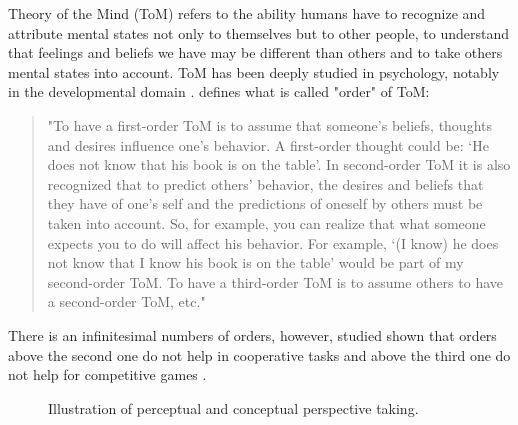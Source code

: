 \documentclass[english,a4paper,11pt,twoside]{StyleThese}
\begin{document}
Theory of the Mind (ToM) refers to the ability humans have to recognize and attribute mental states not only to themselves but to other people, to understand that feelings and beliefs we have may be different than others and to take others mental states into account. ToM has been deeply studied in psychology, notably in the developmental domain \cite{baron1985does, premack1978does}. \cite{verbrugge2008learning} defines what is called "order" of ToM:
\begin{quote}
"To have a first-order ToM is to assume that someone’s beliefs,
thoughts and desires influence one’s behavior. A first-order thought could be: ‘He does not know that his book is on the table’. In second-order ToM it is also recognized that to predict others’ behavior, the desires and beliefs that they have of one’s self and the predictions of oneself by others must be taken into account. So, for example, you can realize that what someone expects you to do will affect his behavior. For example, ‘(I know) he does not know that I know his book is on the table’ would be part of my second-order ToM. To have a third-order ToM is to assume others to have a second-order ToM, etc."
\end{quote}
There is an infinitesimal numbers of orders, however, studied shown that orders above the second one do not help in cooperative tasks \cite{de2014theory} and above the third one do not help for competitive games \cite{de2014theory}.


\begin{figure}[!h]
    \centering
    \caption{Illustration of perceptual and conceptual perspective taking.}
\end{figure}
\end{document}
